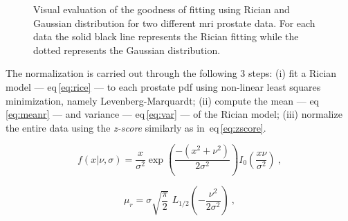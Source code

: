 \begin{figure}
  \centering
  \hfill
  \hfill
  \caption{Visual evaluation of the goodness of fitting using Rician and Gaussian distribution for two different \acs*{mri} prostate data. For each data the solid black line represents the Rician fitting while the dotted represents the Gaussian distribution.}
  \label{fig:fitting}
\end{figure}

The normalization is carried out through the following 3 steps: 
(i) fit a Rician model --- \acs{eq}\,\eqref{eq:rice} --- to each prostate \ac{pdf} using non-linear least squares minimization, namely Levenberg-Marquardt; 
(ii) compute the mean --- \acs{eq}\,\eqref{eq:meanr} --- and variance --- \acs{eq}\,\eqref{eq:var} --- of the Rician model;
(iii) normalize the entire data using the \textit{z-score} similarly as in~\acs{eq}\,\eqref{eq:zscore}.

\begin{equation}
  f(x| \nu, \sigma) = \frac{x}{\sigma^2}\exp\left( \frac{- (x^2 + \nu^2)}{2\sigma^2} \right) I_0 \left( \frac{x \nu}{\sigma^2} \right) \ ,
  \label{eq:rice}
\end{equation}

\begin{equation}
  \mu_{r} = \sigma  \sqrt{\frac{\pi}{2}}\,\,L_{1/2}(-\frac{\nu^2}{2\sigma^2})  \ ,
  \label{eq:meanr}
\end{equation}

